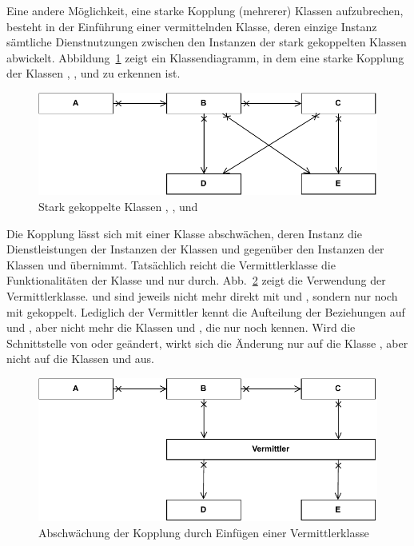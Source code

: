 \pagebreak
Eine andere 
Möglichkeit, eine starke Kopplung (mehrerer) Klassen aufzubrechen, besteht in der Einführung einer vermittelnden Klasse, deren einzige Instanz sämtliche Dienstnutzungen zwischen den Instanzen der stark gekoppelten Klassen abwickelt. Abbildung~\ref{fig:kopplung_stark} zeigt ein Klassendiagramm, in dem eine starke Kopplung der Klassen , ,  und  zu erkennen ist.

\begin{figure}[h!]
	\centering
	\includegraphics[scale=1.0]{Bilder/Kapitel-9/kopplung_stark.pdf}
	\caption{Stark gekoppelte Klassen , ,  und }
	\label{fig:kopplung_stark}
\end{figure}

Die Kopplung lässt sich mit einer Klasse  abschwächen, deren Instanz die Dienstleistungen der Instanzen der Klassen  und  gegenüber den Instanzen der Klassen  und  übernimmt. Tatsächlich reicht die Vermittlerklasse die Funktionalitäten der Klasse  und  nur durch. Abb.~\ref{fig:kopplung_abgeschwaecht} zeigt die Verwendung der Vermittlerklasse.  und  sind jeweils nicht mehr direkt mit  und , sondern nur noch mit  gekoppelt. Lediglich der Vermittler kennt die Aufteilung der Beziehungen auf  und , aber nicht mehr die Klassen  und , die nur noch  kennen. Wird die Schnittstelle von  oder  geändert, wirkt sich die Änderung nur auf die Klasse , aber nicht auf die Klassen  und  aus.

\begin{figure}[h!]
	\centering
	\includegraphics[scale=1.0]{Bilder/Kapitel-9/kopplung_abgeschwaecht.pdf}
	\caption[Abschwächung der Kopplung durch Vermittlerklasse]{Abschwächung der Kopplung durch Einfügen einer Vermittlerklasse}
	\label{fig:kopplung_abgeschwaecht}
\end{figure}

